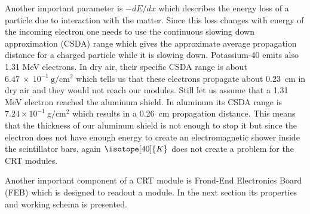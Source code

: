 \documentclass[a4paper]{article}\linespread{1.4}
\begin{document}
Another important parameter is $- dE/dx$ which describes the energy loss of a particle due to interaction with the matter. Since this loss changes with energy of the incoming electron one needs to use the continuous slowing down approximation (CSDA) range which gives the approximate average propagation distance for a charged particle while it is slowing down. 
Potassium-40 emits also 1.31 MeV electrons. In dry air, their specific CSDA range is about $6.47~\times~10^{-1} \ \mathrm{g/{cm}^{2}}$ \cite{csda} which tells us that these electrons propagate about 0.23~cm in dry air and they would not reach our modules. 
Still let us assume that a 1.31 MeV electron reached the aluminum shield. In aluminum its  CSDA range is $7.24 \times 10^{-1} \ \mathrm{g/{cm}^{2}}$ \cite{csda} which results in a 0.26~cm propagation distance. This means that the thickness of our aluminum shield is not enough to stop it but since the electron does not have enough energy to create an electromagnetic shower inside the scintillator bars, again $\isotope[40]{K}$ does not create a problem for the CRT modules. 

Another important component of a CRT module is Frond-End Electronics Board (FEB) which is designed to readout a module. In the next section its properties and working schema is presented.
\end{document}
